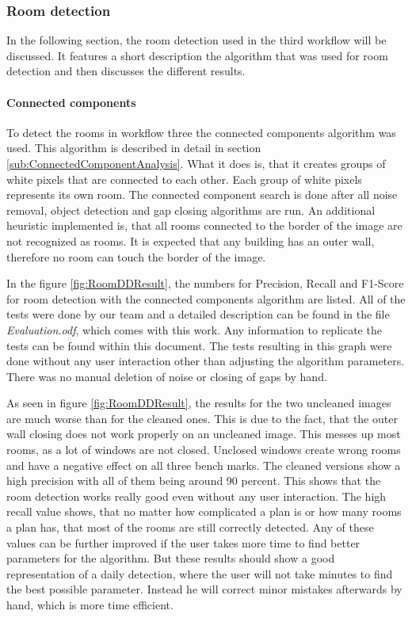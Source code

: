 \subsubsection{Room detection}
\label{sub:RoomDetection}
In the following section, the room detection used in the third workflow will be discussed. It features a short description the algorithm that was used for room detection and then discusses the different results.
\paragraph{Connected components}
\label{sec:ConnectedComponents}
To detect the rooms in workflow three the connected components algorithm was used. This algorithm is described in detail in section \ref{sub:ConnectedComponentAnalysis}. What it does is, that it creates groups of white pixels that are connected to each other. Each group of white pixels represents its own room. The connected component search is done after all noise removal, object detection and gap closing algorithms are run. An additional heuristic implemented is, that all rooms connected to the border of the image are not recognized as rooms. It is expected that any building has an outer wall, therefore no room can touch the border of the image.

In the figure \ref{fig:RoomDDResult}, the numbers for Precision, Recall and F1-Score for room detection with the connected components algorithm are listed. All of the tests were done by our team and a detailed description can be found in the file \textit{Evaluation.odf}, which comes with this work. Any information to replicate the tests can be found within this document. The tests resulting in this graph were done without any user interaction other than adjusting the algorithm parameters. There was no manual deletion of noise or closing of gaps by hand.

As seen in figure \ref{fig:RoomDDResult}, the results for the two uncleaned images are much worse than for the cleaned ones. This is due to the fact, that the outer wall closing does not work properly on an uncleaned image. This messes up most rooms, as a lot of windows are not closed. Unclosed windows create wrong rooms and have a negative effect on all three bench marks. The cleaned versions show a high precision with all of them being around 90 percent. This shows that the room detection works really good even without any user interaction. The high recall value shows, that no matter how complicated a plan is or how many rooms a plan has, that most of the rooms are still correctly detected. Any of these values can be further improved if the user takes more time to find better parameters for the algorithm. But these results should show a good representation of a daily detection, where the user will not take minutes to find the best possible parameter. Instead he will correct minor mistakes afterwards by hand, which is more time efficient.

